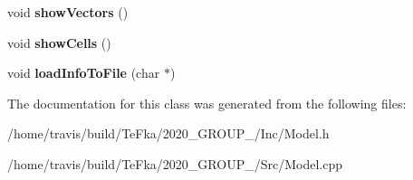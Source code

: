 \begin{DoxyCompactItemize}
\item 
void {\bfseries show\+Vectors} ()\hypertarget{class_model_ac6201ae8b810e878da7c0af337cc6e84}{}\label{class_model_ac6201ae8b810e878da7c0af337cc6e84}

\item 
void {\bfseries show\+Cells} ()\hypertarget{class_model_adb18726e9aee1ec6f0980f5e4624e481}{}\label{class_model_adb18726e9aee1ec6f0980f5e4624e481}

\item 
void {\bfseries load\+Info\+To\+File} (char $\ast$)\hypertarget{class_model_a6f31f2c1849ca236b837521a5303f320}{}\label{class_model_a6f31f2c1849ca236b837521a5303f320}

\end{DoxyCompactItemize}


The documentation for this class was generated from the following files\+:\begin{DoxyCompactItemize}
\item 
/home/travis/build/\+Te\+Fka/2020\+\_\+\+G\+R\+O\+U\+P\+\_/\+Inc/Model.\+h\item 
/home/travis/build/\+Te\+Fka/2020\+\_\+\+G\+R\+O\+U\+P\+\_/\+Src/Model.\+cpp\end{DoxyCompactItemize}
